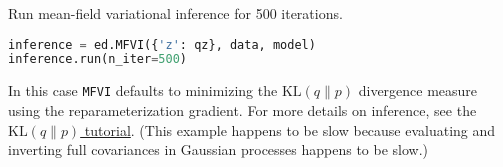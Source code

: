 Run mean-field variational inference for 500 iterations.
\begin{lstlisting}[language=Python]
inference = ed.MFVI({'z': qz}, data, model)
inference.run(n_iter=500)
\end{lstlisting}
In this case
\texttt{MFVI} defaults to minimizing the
$\text{KL}(q\|p)$ divergence measure using the reparameterization
gradient.
For more details on inference, see the \href{tut_KLqp}{$\text{KL}(q\|p)$ tutorial}.
(This example happens to be slow because evaluating and inverting full
covariances in Gaussian processes happens to be slow.)


